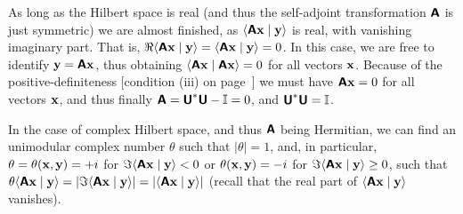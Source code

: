 {As long as the Hilbert space is real (and thus the self-adjoint transformation $ \textsf{\textbf{A}}$ is just symmetric)
we are almost finished, as
$ \langle \textsf{\textbf{A}} {\bf x} \mid {\bf y} \rangle$ is real, with vanishing imaginary part.
That is,
$
\Re  \langle \textsf{\textbf{A}} {\bf x} \mid {\bf y} \rangle   =
\langle \textsf{\textbf{A}} {\bf x} \mid {\bf y} \rangle  =0
$.
In this case, we are free to identify ${\bf y} = \textsf{\textbf{A}} {\bf x}$, thus obtaining
$\langle \textsf{\textbf{A}} {\bf x} \mid \textsf{\textbf{A}} {\bf x}  \rangle  =0$
for all vectors ${\bf x}$.
Because of the positive-definiteness
[condition (iii) on page~\pageref{2016-m-ch-fdvs-pd}]
we must have $ \textsf{\textbf{A}} {\bf x}  =0$
for all vectors ${\bf x}$, and thus finally
$\textsf{\textbf{A}}= \textsf{\textbf{U}}^\ast\textsf{\textbf{U}} - {\Bbb I} =0$,
and $\textsf{\textbf{U}}^\ast\textsf{\textbf{U}} = {\Bbb I}$.

In the case of complex Hilbert space, and thus  $\textsf{\textbf{A}}$ being Hermitian,
we can find an unimodular complex number $\theta$ such that $\vert \theta \vert =1$,
and, in particular,
$\theta = \theta ({\bf x} , {\bf y}) = +i$
for $\Im \langle \textsf{\textbf{A}} {\bf x} \mid {\bf y} \rangle < 0$
or
$\theta ({\bf x} , {\bf y}) = -i$
for $\Im \langle \textsf{\textbf{A}} {\bf x} \mid {\bf y} \rangle \ge 0$,
such that
$\theta \langle \textsf{\textbf{A}} {\bf x} \mid {\bf y} \rangle =
\vert \Im \langle \textsf{\textbf{A}} {\bf x} \mid {\bf y} \rangle \vert =
\vert \langle \textsf{\textbf{A}} {\bf x} \mid {\bf y} \rangle \vert$
(recall that the real part of $\langle \textsf{\textbf{A}} {\bf x} \mid {\bf y} \rangle$ vanishes).

}
